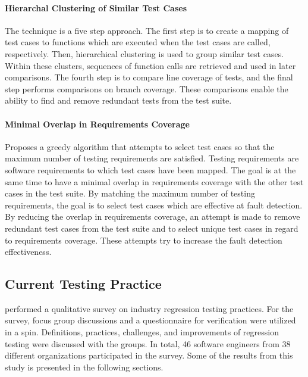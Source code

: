 \documentclass[a4paper,english,12pt]{report}
\begin{document}
\paragraph{Hierarchal Clustering of Similar Test Cases \citep{prasad2012optimizer}}
The technique is a five step approach. The first step is to create a mapping of test cases to functions which are executed when the test cases are called, respectively. Then, hierarchical clustering is used to group similar test cases. Within these clusters, sequences of function calls are retrieved and used in later comparisons. The fourth step is to compare line coverage of tests, and the final step performs comparisons on branch coverage. These comparisons enable the ability to find and remove redundant tests from the test suite. \citep{prasad2012optimizer}

\paragraph{Minimal Overlap in Requirements Coverage \citep{parsa2010optimization}}
Proposes a greedy algorithm that attempts to select test cases so that the maximum number of testing requirements are satisfied. Testing requirements are software requirements to which test cases have been mapped. The goal is at the same time to have a minimal overlap in requirements coverage with the other test cases in the test suite. By matching the maximum number of testing requirements, the goal is to select test cases which are effective at fault detection. By reducing the overlap in requirements coverage, an attempt is made to remove redundant test cases from the test suite and to select unique test cases in regard to requirements coverage. These attempts try to increase the fault detection effectiveness. \citep{parsa2010optimization}

\subsection{Current Testing Practice}
\citet{engstrom2010qualitative} performed a qualitative survey on industry regression testing practices. For the survey, focus group discussions and a questionnaire for verification were utilized in a \gls{spin}. Definitions, practices, challenges, and improvements of regression testing were discussed with the groups. In total, 46 software engineers from 38 different organizations participated in the survey. Some of the results from this study is presented in the following sections. \citep[p. 248-249]{runeson2012regression}
\end{document}
